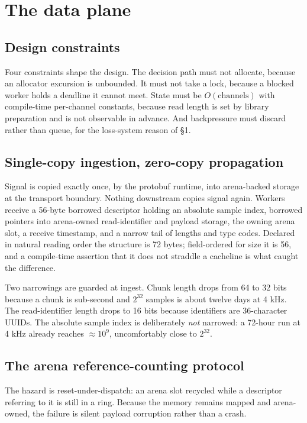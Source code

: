 \documentclass[sigconf,nonacm]{acmart}
\begin{document}
\section{The data plane}
\label{sec:plane}

\subsection{Design constraints}

Four constraints shape the design. The decision path must not allocate, because an allocator
excursion is unbounded. It must not take a lock, because a blocked worker holds a deadline it
cannot meet. State must be $O(\text{channels})$ with compile-time per-channel constants,
because read length is set by library preparation and is not observable in advance. And
backpressure must discard rather than queue, for the loss-system reason of \S1.

\subsection{Single-copy ingestion, zero-copy propagation}

Signal is copied exactly once, by the protobuf runtime, into arena-backed storage at the
transport boundary. Nothing downstream copies signal again. Workers receive a 56-byte borrowed
descriptor holding an absolute sample index, borrowed pointers into arena-owned
read-identifier and payload storage, the owning arena slot, a receive timestamp, and a narrow
tail of lengths and type codes. Declared in natural reading order the structure is 72 bytes;
field-ordered for size it is 56, and a compile-time assertion that it does not straddle a
cacheline is what caught the difference.

Two narrowings are guarded at ingest. Chunk length drops from 64 to 32 bits because a chunk is
sub-second and $2^{32}$ samples is about twelve days at 4 kHz. The read-identifier length drops
to 16 bits because identifiers are 36-character UUIDs. The absolute sample index is
deliberately \emph{not} narrowed: a 72-hour run at 4 kHz already reaches ${\approx}10^9$,
uncomfortably close to $2^{32}$.

\subsection{The arena reference-counting protocol}

The hazard is reset-under-dispatch: an arena slot recycled while a descriptor referring to it
is still in a ring. Because the memory remains mapped and arena-owned, the failure is silent
payload corruption rather than a crash.
\end{document}
